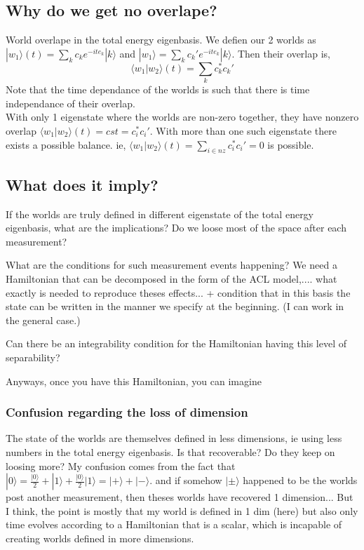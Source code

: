 \documentclass{article}
\begin{document}
\subsection{Why do we get no overlape?}
World overlape in the total energy eigenbasis. We defien our 2 worlds as $|w_1\rangle(t)=\sum_kc_ke^{-ite_k}|k\rangle$ and $|w_1\rangle=\sum_kc_k'e^{-ite_k}|k\rangle$. 
Then their overlap is,
\begin{equation}
    \langle w_1|w_2 \rangle(t) = \sum_{k}c_k^*c_k'
\end{equation}
Note that the time dependance of the worlds is such that there is time independance of their overlap.\\

With only 1 eigenstate where the worlds are non-zero together, they have nonzero overlap $\langle w_1|w_2 \rangle(t)=cst=c_i^*c_i'$. With more than one such eigenstate there exists a possible balance. ie, $\langle w_1|w_2 \rangle(t)=\sum_{i\in nz}c_i^*c_i'=0$ is possible. 





\subsection{What does it imply?}

If the worlds are truly defined in different eigenstate of the total energy eigenbasis, what are the implications? Do we loose most of the space after each measurement? 

What are the conditions for such measurement events happening? We need a Hamiltonian that can be decomposed in the form of the ACL model,.... what exactly is needed to reproduce theses effects... 
+ condition that in this basis the state can be written in the manner we specify at the beginning. (I can work in the general case.) 

Can there be an integrability condition for the Hamiltonian having this level of separability? 

Anyways, once you have this Hamiltonian, you can imagine

\subsubsection{Confusion regarding the loss of dimension}

The state of the worlds are themselves defined in less dimensions, ie using less numbers in the total energy eigenbasis. Is that recoverable? Do they keep on loosing more? 
My confusion comes from the fact that $|0\rangle=\frac{|0\rangle}{2}+|1\rangle+\frac{|0\rangle}{2}|1\rangle=|+\rangle+|-\rangle$. and if somehow $|\pm\rangle$ happened to be the worlds post another measurement, then theses worlds have recovered 1 dimension... 
But I think, the point is mostly that my world is defined in 1 dim (here) but also only time evolves according to a Hamiltonian that is a scalar, which is incapable of creating worlds defined in more dimensions.
\end{document}
